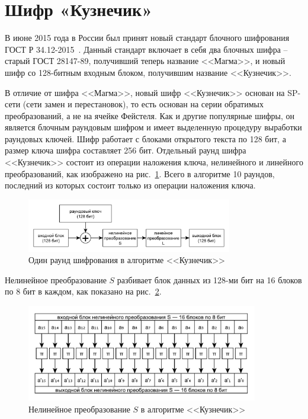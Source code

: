 \section{Шифр «Кузнечик»}\label{section-grig}

В июне 2015 года в России был принят новый стандарт блочного шифрования ГОСТ Р 34.12-2015~\cite{GOST-R:34.12-2015}. Данный стандарт включает в себя два блочных шифра -- старый ГОСТ 28147-89, получивший теперь название <<Магма>>, и новый шифр со 128-битным входным блоком, получившим название <<Кузнечик>>.

В отличие от шифра <<Магма>>, новый шифр <<Кузнечик>> основан на SP-сети (сети замен и перестановок), то есть основан на серии обратимых преобразований, а не на ячейке Фейстеля. Как и другие популярные шифры, он является блочным раундовым шифром и имеет выделенную процедуру выработки раундовых ключей. Шифр работает с блоками открытого текста по 128 бит, а размер ключа шифра составляет 256 бит. Отдельный раунд шифра <<Кузнечик>> состоит из операции наложения ключа, нелинейного и линейного преобразований, как изображено на рис.~\ref{fig:kuznechik-step}. Всего в алгоритме 10 раундов, последний из которых состоит только из операции наложения ключа. 

\begin{figure}[htb]
	\centering
	\includegraphics[width=0.8\textwidth]{pic/kuznechik-step}
  \caption{Один раунд шифрования в алгоритме <<Кузнечик>>}
  \label{fig:kuznechik-step}
\end{figure}

Нелинейное преобразование $S$ разбивает блок данных из 128-ми бит на 16 блоков по 8 бит в каждом, как показано на рис.~\ref{fig:kuznechik-s}.

\begin{figure}[htb]
	\centering
	\includegraphics[width=0.9\textwidth]{pic/kuznechik-s}
  \caption{Нелинейное преобразование $S$ в алгоритме <<Кузнечик>>}
  \label{fig:kuznechik-s}
\end{figure}

